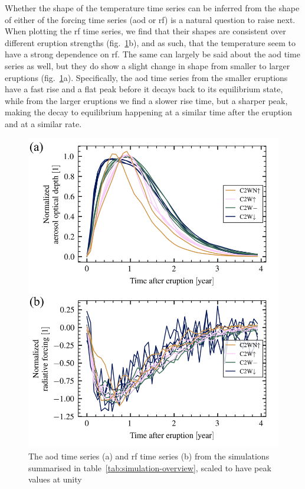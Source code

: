 \documentclass{ametsocV6.1}
\begin{document}
Whether the shape of the temperature time series can be inferred from the shape of
either of the forcing time series (\gls{aod} or \gls{rf}) is a natural question to raise
next. When plotting the \gls{rf} time series, we find that their shapes are consistent
over different eruption strengths (fig.~\ref{fig:arrays_normalised}b), and as such, that
the temperature seem to have a strong dependence on \gls{rf}. The same can largely be
said about the \gls{aod} time series as well, but they do show a slight change in shape
from smaller to larger eruptions (fig.~\ref{fig:arrays_normalised}a). Specifically, the
\gls{aod} time series from the smaller eruptions have a fast rise and a flat peak before
it decays back to its equilibrium state, while from the larger eruptions we find a
slower rise time, but a sharper peak, making the decay to equilibrium happening at a
similar time after the eruption and at a similar rate.

\begin{figure}
  \centering
  \includegraphics[width=0.95\linewidth]{figures/arrays_combined_normalized.png}

  \caption{The \gls{aod} time series (a) and \gls{rf} time series (b) from the simulations
    summarised in table~\ref{tab:simulation-overview}, scaled to have peak values at unity
  }\label{fig:arrays_normalised}
\end{figure}
\end{document}
